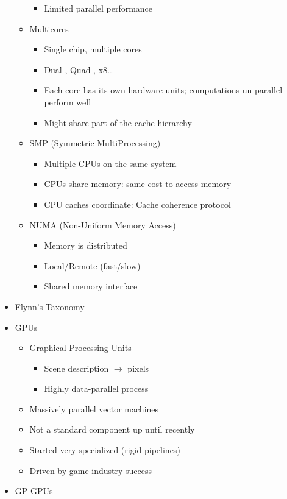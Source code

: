 \documentclass[a4paper]{article}
\begin{document}
\begin{itemize}
\begin{itemize}
\begin{itemize}
\begin{itemize}
\end{itemize}
\item Limited parallel performance
\end{itemize}
\item Multicores
\begin{itemize}
\item Single chip, multiple cores
\item Dual-, Quad-, x8\dots
\item Each core has its own hardware units; computations un parallel perform well
\item Might share part of the cache hierarchy
\end{itemize}
\item SMP (Symmetric MultiProcessing)
\begin{itemize}
\item Multiple CPUs on the same system
\item CPUs share memory: same cost to access memory
\item CPU caches coordinate: Cache coherence protocol
\end{itemize}
\item NUMA (Non-Uniform Memory Access)
\begin{itemize}
\item Memory is distributed
\item Local/Remote (fast/slow)
\item Shared memory interface
\end{itemize}
\end{itemize}
\item Flynn's Taxonomy 
\item GPUs
\begin{itemize}
\item Graphical Processing Units 
\begin{itemize}
\item Scene description $\to$ pixels
\item Highly data-parallel process
\end{itemize}
\item Massively parallel vector machines
\item Not a standard component up until recently
\item Started very specialized (rigid pipelines)
\item Driven by game industry success
\end{itemize}
\item GP-GPUs

\end{itemize}
\end{document}
